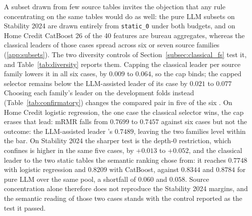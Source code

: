 \documentclass[final,5p,twocolumn]{elsarticle}
\providecommand{\DIFaddtex}[1]{{\protect\color{blue} \sf #1}} %
\providecommand{\DIFdeltex}[1]{{\protect\color{red} \scriptsize #1}} %
\providecommand{\DIFaddbegin}{} %
\providecommand{\DIFaddend}{} %
\providecommand{\DIFdelbegin}{} %
\providecommand{\DIFdelend}{} %
\providecommand{\DIFadd}[1]{\texorpdfstring{\DIFaddtex{#1}}{#1}} %
\providecommand{\DIFdel}[1]{\texorpdfstring{\DIFdeltex{#1}}{}} %
\begin{document}
\DIFdelbegin \DIFdel{A subset drawn from few source tables invites the objection that any rule concentrating on the same tables would do as well: the pure LLM subsets on Stability 2024 are drawn entirely from \texttt{static\_0} under both budgets, and on Home Credit CatBoost 26 of the 40 features are bureau aggregates, whereas the classical leaders of those cases spread across six or seven source families (\ref{app:subsets}). The two diversity controls of Section~\ref{subsec:classical_fs} test it, and Table~\ref{tab:diversity} reports them. Capping the classical leader per source family lowers it in all six cases, by $0.009$ to $0.064$, so the cap binds; the capped selector remains below the LLM-assisted leader of its case by $0.021$ to $0.077$ }\DIFdelend \DIFaddbegin \DIFadd{Choosing each family's leader on the development folds instead (Table~\ref{tab:confirmatory}) changes the compared pair }\DIFaddend in five of \DIFdelbegin \DIFdel{the six . On Home Credit logistic regression, the one case the classical selector wins, the cap erases that lead: mRMR falls from $0.7699$ to $0.7457$ against }\DIFdelend \DIFaddbegin \DIFadd{six cases but not the outcome: }\DIFaddend the LLM-assisted leader \DIFdelbegin \DIFdel{'s $0.7489$, leaving the two families level within the bar. On Stability 2024 the sharper test is the depth-0 restriction, which confines }\DIFdelend \DIFaddbegin \DIFadd{is higher in the same five cases, by $+0.013$ to $+0.052$, and }\DIFaddend the classical leader \DIFdelbegin \DIFdel{to the two static tables the semantic ranking chose from: it reaches $0.7748$ with logistic regression and $0.8209$ with CatBoost, against $0.8344$ and $0.8784$ for pure LLM over the same pool, a shortfall of $0.060$ and $0.058$. Source concentration alone therefore does not reproduce the Stability 2024 margins, and the semantic reading of those two cases stands with the control reported as the test it passed.
}%
\end{document}
